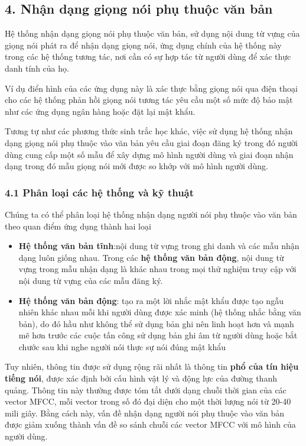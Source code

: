 \documentclass{article}
\begin{document}
	\subsection{4. Nhận dạng giọng nói phụ thuộc văn bản}
	
	\qquad Hệ thống nhận dạng giọng nói phụ thuộc văn bản, sử dụng nội dung từ vựng của giọng nói phát ra để nhận dạng giọng nói, ứng dụng chính của hệ thống này trong các hệ thống tương tác, nơi cần có sự hợp tác từ người dùng để xác thực danh tính của họ.
	
	Ví dụ điển hình của các ứng dụng này là xác thực bằng giọng nói qua điện thoại cho các hệ thống phản hồi giọng nói tương tác yêu cầu một số mức độ bảo mật như các ứng dụng ngân hàng hoặc đặt lại mật khẩu. 
	
	Tương tự như các phương thức sinh trắc học khác, việc sử dụng hệ thống nhận dạng giọng nói phụ thuộc vào văn bản yêu cầu giai đoạn đăng ký trong đó người dùng cung cấp một số mẫu để xây dựng mô hình người dùng và giai đoạn nhận dạng trong đó mẫu giọng nói mới được so khớp với mô hình người dùng.
		
	\subsubsection{4.1 Phân loại các hệ thống và kỹ thuật}
	\qquad Chúng ta có thể phân loại hệ thống nhận dạng người nói phụ thuộc vào văn bản theo quan điểm ứng dụng thành hai loại
	\begin{itemize}
		\item \textbf{Hệ thống văn bản tĩnh}:nội dung từ vựng trong ghi danh và các mẫu nhận dạng luôn giống nhau. Trong các \textbf{hệ thống văn bản động}, nội dung từ vựng trong mẫu nhận dạng là khác nhau trong mọi thử nghiệm truy cập với nội dung từ vựng của các mẫu đăng ký.
		\item \textbf{Hệ thống văn bản động}: tạo ra một lời nhắc mật khẩu được tạo ngẫu nhiên khác nhau mỗi khi người dùng được xác minh (hệ thống nhắc bằng văn bản), do đó hầu như không thể sử dụng bản ghi nên linh hoạt hơn và mạnh mẽ hơn trước các cuộc tấn công sử dụng bản ghi âm từ người dùng hoặc bắt chước sau khi nghe người nói thực sự nói đúng mật khẩu
	\end{itemize}
		
	Tuy nhiên, thông tin được sử dụng rộng rãi nhất là thông tin \textbf{phổ của tín hiệu tiếng nói}, được xác định bởi cấu hình vật lý và động lực của đường thanh quảng. Thông tin này thường được tóm tắt dưới dạng chuỗi thời gian của các vector MFCC, mỗi vector trong số đó đại diện cho một thời lượng nói từ 20-40 mili giây. Bằng cách này, vấn đề nhận dạng người nói phụ thuộc vào văn bản được giảm xuống thành vấn đề so sánh chuỗi các vector MFCC với mô hình của người dùng. 
	
\end{document}
